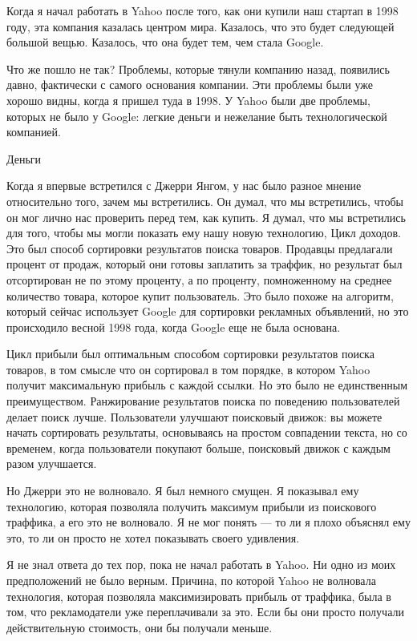 \documentclass[ebook,12pt,oneside,openany]{memoir}
\date{}
\begin{document}
\maketitle

Когда я начал работать в Yahoo после того, как они купили наш стартап
в 1998 году, эта компания казалась центром мира. Казалось, что это
будет следующей большой вещью. Казалось, что она будет тем, чем стала
Google.

Что же пошло не так? Проблемы, которые тянули компанию назад,
появились давно, фактически с самого основания компании. Эти проблемы
были уже хорошо видны, когда я пришел туда в 1998. У Yahoo были две
проблемы, которых не было у Google: легкие деньги и нежелание быть
технологической компанией.

Деньги


Когда я впервые встретился с Джерри Янгом, у нас было разное мнение
относительно того, зачем мы встретились. Он думал, что мы встретились,
чтобы он мог лично нас проверить перед тем, как купить. Я думал, что
мы встретились для того, чтобы мы могли показать ему нашу новую
технологию, Цикл доходов. Это был способ сортировки результатов поиска
товаров. Продавцы предлагали процент от продаж, который они готовы
заплатить за траффик, но результат был отсортирован не по этому
проценту, а по проценту, помноженному на среднее количество товара,
которое купит пользователь. Это было похоже на алгоритм, который
сейчас использует Google для сортировки рекламных объявлений, но это
происходило весной 1998 года, когда Google еще не была основана.

Цикл прибыли был оптимальным способом сортировки результатов поиска
товаров, в том смысле что он сортировал в том порядке, в котором Yahoo
получит максимальную прибыль с каждой ссылки. Но это было не
единственным преимуществом. Ранжирование результатов поиска по
поведению пользователей делает поиск лучше. Пользователи улучшают
поисковый движок: вы можете начать сортировать результаты, основываясь
на простом совпадении текста, но со временем, когда пользователи
покупают больше, поисковый движок с каждым разом улучшается.

Но Джерри это не волновало. Я был немного смущен. Я показывал ему
технологию, которая позволяла получить максимум прибыли из поискового
траффика, а его это не волновало. Я не мог понять — то ли я плохо
объяснял ему это, то ли он просто не хотел показывать своего
удивления.

Я не знал ответа до тех пор, пока не начал работать в Yahoo. Ни одно
из моих предположений не было верным. Причина, по которой Yahoo не
волновала технология, которая позволяла максимизировать прибыль от
траффика, была в том, что рекламодатели уже переплачивали за это. Если
бы они просто получали действительную стоимость, они бы получали
меньше.
\end{document}
